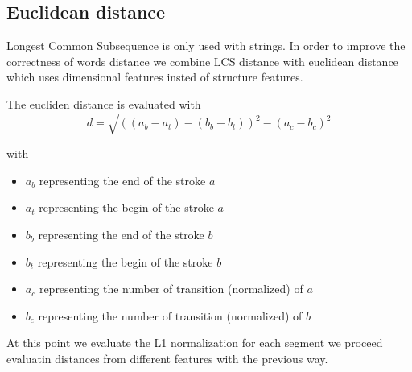 \subsection{Euclidean distance} 

Longest Common Subsequence is only used with strings. In order to improve the correctness of words distance we combine LCS distance with euclidean distance which uses dimensional features insted of structure features.

The eucliden distance is evaluated with
$$d = \sqrt{((a_b - a_t)−(b_b - b_t))^2 -(a_c - b_c)^2}$$

with

\begin{itemize}
\item $a_b$ representing the end of the stroke $a$
\item $a_t$ representing the begin of the stroke $a$
\item $b_b$ representing the end of the stroke $b$
\item $b_t$ representing the begin of the stroke $b$
\item $a_c$ representing the number of transition (normalized) of $a$
\item $b_c$ representing the number of transition (normalized) of $b$
\end{itemize}

At this point we evaluate the L1 normalization for each segment we proceed evaluatin distances from different features with the previous way.